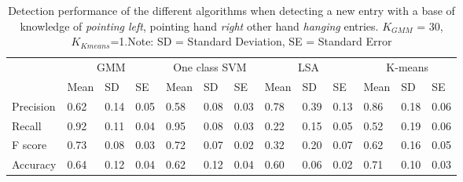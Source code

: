 \begin{table}[!ht]
	\footnotesize
	\renewcommand{\arraystretch}{2}
	\begin{tabular}{p{1.2cm}p{0.7cm}p{0.6cm}p{0.7cm}p{0.7cm}p{0.6cm}p{0.7cm}p{0.7cm}p{0.6cm}p{0.7cm}p{0.7cm}p{0.6cm}p{0.7cm}}
	\hline 
	 & \multicolumn{3}{c}{GMM}& \multicolumn{3}{c}{One class SVM}& \multicolumn{3}{c}{LSA}& \multicolumn{3}{c}{K-means} \\
	 & Mean    & SD & SE& Mean    & SD & SE& Mean    & SD & SE& Mean    & SD & SE \\
	\hline
	Precision  & 0.62 & 0.14 & 0.05 & 0.58 & 0.08 & 0.03 & 0.78 & 0.39 & 0.13 & 0.86 & 0.18 & 0.06       \\
	Recall  & 0.92 & 0.11 & 0.04 & 0.95 & 0.08 & 0.03 & 0.22 & 0.15 & 0.05 & 0.52 & 0.19 & 0.06    \\
	F score  & 0.73 & 0.08 & 0.03 & 0.72 & 0.07 & 0.02 & 0.32 & 0.20 & 0.07 & 0.62 & 0.16 & 0.05    \\
	Accuracy   & 0.64 & 0.12 & 0.04 & 0.62 & 0.12 & 0.04 & 0.60 & 0.06 & 0.02 & 0.71 & 0.10 & 0.03   \\
	\hline
	\end{tabular}
	\centering
	\caption[Novelty Detection perfomance for \emph{pointing left}, pointing hand \emph{right} other hand \emph{hanging} entries]{Detection performance of the different algorithms when detecting a new entry with a base of knowledge of \emph{pointing left}, pointing hand \emph{right} other hand \emph{hanging} entries. $ K_{GMM} $ = 30, $ K_{Kmeans} $=1.Note: SD = Standard Deviation, SE = Standard Error}
\end{table}


